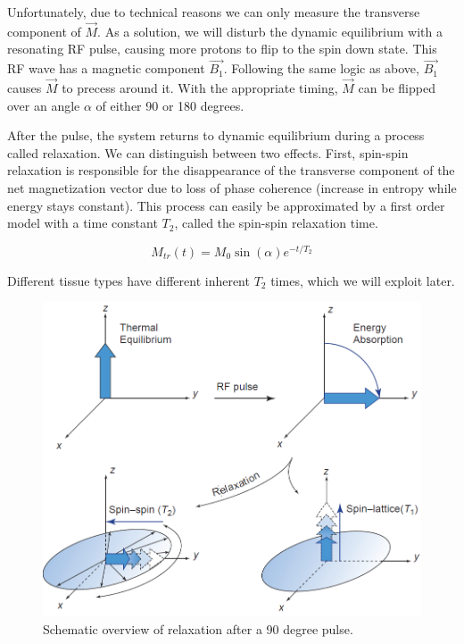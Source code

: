 Unfortunately, due to technical reasons we can only measure the transverse
component of $\vec{M}$. As a solution, we will disturb the dynamic equilibrium
with a resonating RF pulse, causing more protons to flip to the spin down state.
This RF wave has a magnetic component $\vec{B_1}$. Following the same logic as
above, $\vec{B_1}$ causes $\vec{M}$ to precess around it. With the appropriate
timing, $\vec{M}$ can be flipped over an angle $\alpha$ of either 90 or 180
degrees.

After the pulse, the system returns to dynamic equilibrium during a process
called relaxation. We can distinguish between two effects. First, spin-spin
relaxation is responsible for the disappearance of the transverse component of
the net magnetization vector due to loss of phase coherence (increase in
entropy while energy stays constant). This process can easily be approximated
by a first order model with a time constant $T_2$, called the spin-spin
relaxation time.

\begin{equation}
M_{tr}(t) = M_0 \sin(\alpha) e^{-t/T_2}
\end{equation}

Different tissue types have different inherent $T_2$ times, which we will
exploit later.

\begin{figure}[ht]
\begin{center}
  \includegraphics[width=\linewidth]{img/relaxation.png}
  \caption{Schematic overview of relaxation after a 90 degree pulse. \cite{suetens}}
  \label{fig:relaxation}
\end{center}
\end{figure}

